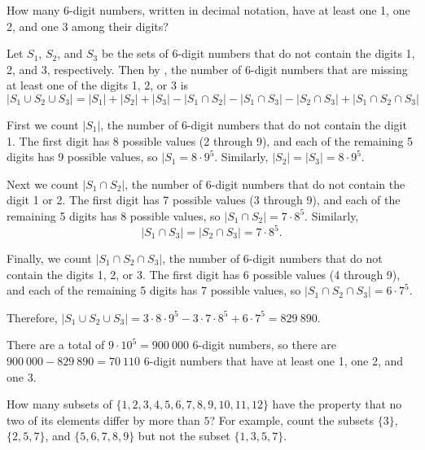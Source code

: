 \documentclass{article}
\begin{document}
\begin{example}
    How many 6-digit numbers, written in decimal notation, have at least one 1, one 2, and one 3 among their digits?
\end{example}

\begin{soln}
    Let $S_1$, $S_2$, and $S_3$ be the sets of 6-digit numbers that do not contain the digits 1, 2, and 3, respectively.
    Then by , the number of 6-digit numbers that are missing at least one of the digits 1, 2, or 3 is
    \[
        |S_1 \cup S_2 \cup S_3| = |S_1| + |S_2| + |S_3| - |S_1 \cap S_2|- |S_1 \cap S_3| - |S_2 \cap S_3| + |S_1 \cap S_2 \cap S_3|
    \]

    First we count $|S_1|$, the number of 6-digit numbers that do not contain the digit 1.
    The first digit has 8 possible values (2 through 9), and each of the remaining 5 digits has 9 possible values,
    so $|S_1 = 8 \cdot 9^5$. Similarly, $|S_2| = |S_3| = 8 \cdot 9^5$.

    Next we count $|S_1 \cap S_2|$, the number of 6-digit numbers that do not contain the digit 1 or 2.
    The first digit has 7 possible values (3 through 9), and each of the remaining 5 digits has 8 possible values,
    so $|S_1 \cap S_2| = 7 \cdot 8^5$. Similarly, 
    \[ 
        |S_1 \cap S_3| = |S_2 \cap S_3| = 7 \cdot 8^5.
    \]

    Finally, we count $|S_1 \cap S_2 \cap S_3|$, the number of 6-digit numbers that do not contain the digits 1, 2, or 3.
    The first digit has 6 possible values (4 through 9), and each of the remaining 5 digits has 7 possible values,
    so $|S_1 \cap S_2 \cap S_3| = 6 \cdot 7^5$.

    Therefore, $|S_1 \cup S_2 \cup S_3| = 3 \cdot 8 \cdot 9^5 - 3 \cdot 7 \cdot 8^5 + 6 \cdot 7^5 = 829\ 890.$
    
    There are a total of $9 \cdot 10^5 = 900\ 000$ 6-digit numbers,
    so there are $900\ 000 - 829\ 890 = \boxed{70\ 110}$ 6-digit numbers that have at least one 1, one 2, and one 3.
\end{soln}

\begin{example}
    How many subsets of $\{1, 2, 3, 4, 5, 6, 7, 8, 9, 10, 11, 12\}$
    have the property that no two of its elements differ by more than $5$?
    For example, count the subsets $\{3\}$, $\{2, 5, 7\}$, and $\{5, 6, 7, 8, 9\}$
    but not the subset $\{1, 3, 5, 7\}.$
\end{example}
\end{document}

